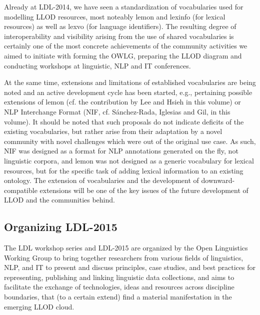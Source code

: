Already at LDL-2014, we have seen a standardization of vocabularies used for modelling LLOD resources, most noteably lemon and lexinfo (for lexical resources) as well as lexvo (for language identifiers). The resulting degree of interoperability and visibility arising from the use of shared vocabularies is certainly one of the most concrete achievements of the community activities we aimed to initiate with forming the OWLG, preparing the LLOD diagram and conducting workshops at linguistic, NLP and IT conferences.

At the same time, extensions and limitations of established vocabularies are being noted and an active development cycle has been started, e.g., pertaining possible extensions of lemon (cf. the contribution by Lee and Hsieh in this volume) or NLP Interchange Format (NIF, cf. S\'{a}nchez-Rada, Iglesias and Gil, in this volume). 
It should be noted that such proposals do not indicate deficits of the existing vocabularies, but rather arise from their adaptation by a novel community with novel challenges which were out of the original use case. As such, NIF was designed as a format for NLP annotations generated on the fly, not linguistic corpora, and lemon was not designed as a generic vocabulary for lexical resources, but for the specific task of adding lexical information to an existing ontology. 
The extension of vocabularies and the development of downward-compatible extensions will be one of the key issues of the future development of LLOD and the communities behind.
 
\subsection{Organizing LDL-2015}

The LDL workshop series and LDL-2015 are organized by the Open Linguistics Working Group 
to bring together researchers from various fields of linguistics, NLP, and IT to present and discuss principles, case studies, and best practices for representing, publishing and linking linguistic data collections, and aims to facilitate the exchange of technologies, ideas and resources across discipline boundaries, that (to a certain extend) find a material manifestation in the emerging LLOD cloud.

